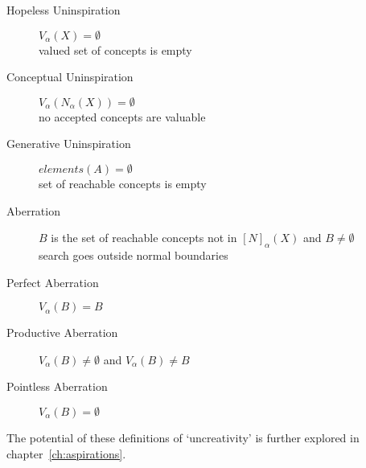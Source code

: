 \begin{description}
  \item [Hopeless Uninspiration] $V_\alpha (X) = \emptyset$\\ valued set of concepts is empty
  \item [Conceptual Uninspiration] $V_\alpha (N_\alpha (X)) = \emptyset$\\ no accepted concepts are valuable
  \item [Generative Uninspiration] $elements(A) = \emptyset$\\ set of reachable concepts is empty
  \item [Aberration] $B$ is the set of reachable concepts not in $[N]_\alpha (X)$ and $B \neq \emptyset$\\ search goes outside normal boundaries
  \item [Perfect Aberration] $V_\alpha (B) = B$
  \item [Productive Aberration] $V_\alpha (B) \neq \emptyset$ and $V_\alpha (B) \neq B$
  \item [Pointless Aberration] $V_\alpha (B) = \emptyset$
\end{description}

The potential of these definitions of `uncreativity' is further explored in chapter~\ref{ch:aspirations}.







\stopcontents[chapters]
